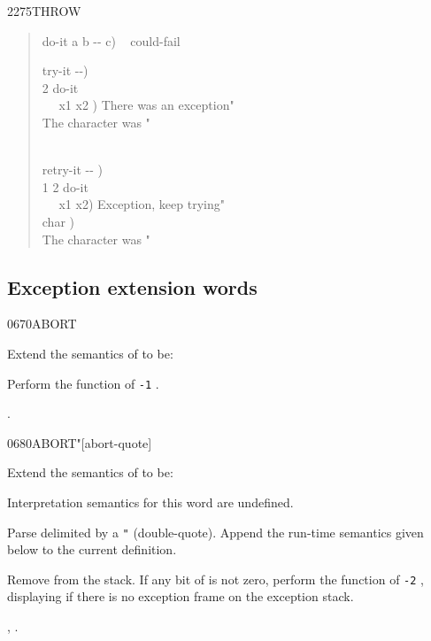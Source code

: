 \begin{worddef}{2275}{THROW}
\begin{rationale}
\begin{quote}
			\word{:} do-it  a b -{}- c) ~
				 could-fail \word{;}

			\word{:} try-it  -{}-) \\
			 2 \word{[']} do-it~ ~  \\
			\tab~~  x1 x2 ) 
				  There was an exception"  \\
			\tab {}
				 The character was "   \\
			\tab {} \\
			\word{;}

			\word{;} retry-it  -{}- ) \\
			\tab {}  1 2 \word{[']} do-it ~
				 \\
			\tab~~  x1 x2) 
				 Exception, keep trying"  \\
			\tab {}  char ) \\
			\tab {} The character was "   \\
			\word{;}
		\end{quote}
	\end{rationale}
\end{worddef}


\subsection{Exception extension words} %
\extended

\begin{worddef}{0670}{ABORT}
\item Extend the semantics of  to be:


	Perform the function of \texttt{-1} .

\see {}.
\end{worddef}


\begin{worddef}[ABORTq]{0680}{ABORT"}[abort-quote]
\item Extend the semantics of  to be:

\interpret
	Interpretation semantics for this word are undefined.

\compile

	Parse  delimited by a \texttt{"} (double-quote).
	Append the run-time semantics given below to the current
	definition.

\runtime

	Remove  from the stack. If any bit of 
	is not zero, perform the function of \texttt{-2} ,
	displaying  if there is no exception frame on the
	exception stack.

\see {},
	.
\end{worddef}

